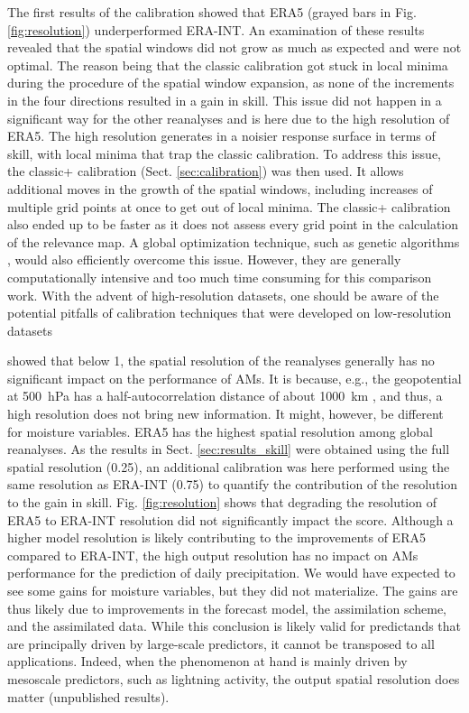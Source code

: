 \documentclass[alpha-refs]{wiley-article}
\begin{document}
The first results of the calibration showed that ERA5 (grayed bars in Fig. \ref{fig:resolution}) underperformed ERA-INT. An examination of these results revealed that the spatial windows did not grow as much as expected and were not optimal. The reason being that the classic calibration got stuck in local minima during the procedure of the spatial window expansion, as none of the increments in the four directions resulted in a gain in skill. This issue did not happen in a significant way for the other reanalyses and is here due to the high resolution of ERA5. The high resolution generates in a noisier response surface in terms of skill, with local minima that trap the classic calibration. To address this issue, the classic+ calibration (Sect. \ref{sec:calibration}) was then used. It allows additional moves in the growth of the spatial windows, including increases of multiple grid points at once to get out of local minima. The classic+ calibration also ended up to be faster as it does not assess every grid point in the calculation of the relevance map. A global optimization technique, such as genetic algorithms \citep{Horton2017a}, would also efficiently overcome this issue. However, they are generally computationally intensive and too much time consuming for this comparison work. With the advent of high-resolution datasets, one should be aware of the potential pitfalls of calibration techniques that were developed on low-resolution datasets

\citet{Horton2018b} showed that below 1\degree, the spatial resolution of the reanalyses generally has no significant impact on the performance of AMs. It is because, e.g., the geopotential at 500~hPa has a half-autocorrelation distance of about 1000~km \cite{Thiebaux1985}, and thus, a high resolution does not bring new information. It might, however, be different for moisture variables. ERA5 has the highest spatial resolution among global reanalyses. As the results in Sect. \ref{sec:results_skill} were obtained using the full spatial resolution (0.25\degree), an additional calibration was here performed using the same resolution as ERA-INT (0.75\degree) to quantify the contribution of the resolution to the gain in skill. Fig. \ref{fig:resolution} shows that degrading the resolution of ERA5 to ERA-INT resolution did not significantly impact the score. Although a higher model resolution is likely contributing to the improvements of ERA5 compared to ERA-INT, the high output resolution has no impact on AMs performance for the prediction of daily precipitation. We would have expected to see some gains for moisture variables, but they did not materialize. The gains are thus likely due to improvements in the forecast model, the assimilation scheme, and the assimilated data. While this conclusion is likely valid for predictands that are principally driven by large-scale predictors, it cannot be transposed to all applications. Indeed, when the phenomenon at hand is mainly driven by mesoscale predictors, such as lightning activity, the output spatial resolution does matter (unpublished results).
\end{document}

